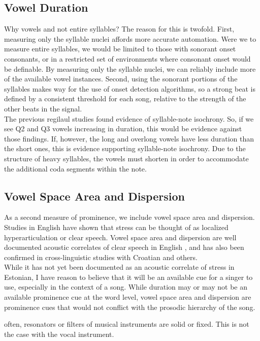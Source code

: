 \subsection{Vowel Duration}
Why vowels and not entire syllables? The reason for this is twofold. First, measuring only the syllable nuclei affords more accurate automation. Were we to measure entire syllables, we would be limited to those with sonorant onset consonants, or in a restricted set of environments where consonant onset would be definable. By measuring only the syllable nuclei, we can reliably include more of the available vowel instances. Second, using the sonorant portions of the syllables makes way for the use of onset detection algorithms, so a strong beat is defined by a consistent threshold for each song, relative to the strength of the other beats in the signal. \\
The previous regilaul studies found evidence of syllable-note isochrony. So, if we see Q2 and Q3 vowels increasing in duration, this would be evidence against those findings. If, however, the long and overlong vowels have less duration than the short ones, this is evidence supporting syllable-note isochrony. Due to the structure of heavy syllables, the vowels must shorten in order to accommodate the additional coda segments within the note. 


\subsection{Vowel Space Area and Dispersion}

As a second measure of prominence, we include vowel space area and dispersion. Studies in English have shown that stress can be thought of as localized hyperarticulation or clear speech. \cite{deJong} Vowel space area and dispersion are well documented acoustic correlates of clear speech in English \cite{bradlow}, and has also been confirmed in cross-linguistic studies with Croatian \cite{rajka} and others. \\

While it has not yet been documented as an acoustic correlate of stress in Estonian, I have reason to believe that it will be an available cue for a singer to use, especially in the context of a song. While duration may or may not be an available prominence cue at the word level, vowel space area and dispersion are prominence cues that would not conflict with the prosodic hierarchy of the song. 

often, resonators or filters of musical instruments are solid or fixed. This is not the case with the vocal instrument.




